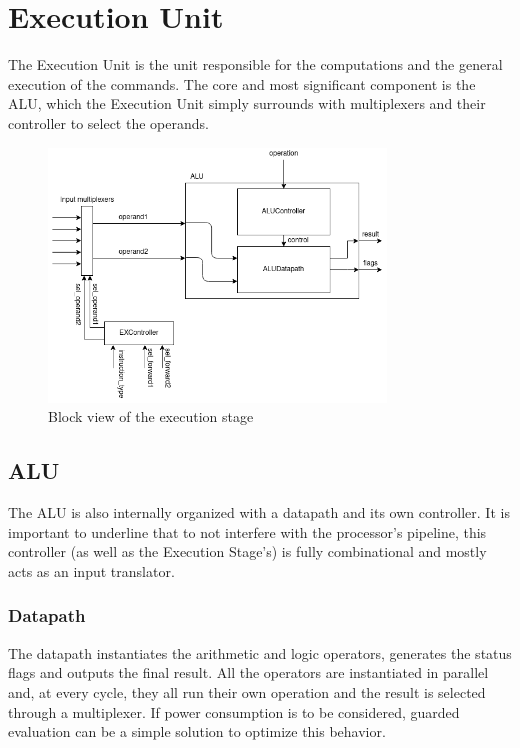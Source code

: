 \section{Execution Unit}
The Execution Unit is the unit responsible for the computations and the general execution of the commands.
The core and most significant component is the ALU, which the Execution Unit simply surrounds with multiplexers
and their controller to select the operands.

\begin{figure}[htbp]
    \center
	\includegraphics[width=0.8\textwidth]{./2-implementation/images/ExStage.png}
	\caption{Block view of the execution stage}
	\label{fig:exstage}
\end{figure}

\subsection{ALU}
The ALU is also internally organized with a datapath and its own controller. It is important to underline that to not
interfere with the processor's pipeline, this controller (as well as the Execution Stage's) is fully combinational and
mostly acts as an input translator.

\subsubsection{Datapath}
The datapath instantiates the arithmetic and logic operators, generates the status flags and outputs the final result.
All the operators are instantiated in parallel and, at every cycle, they all run their own operation and the result
is selected through a multiplexer. If power consumption is to be considered, guarded evaluation can be a simple
solution to optimize this behavior.

